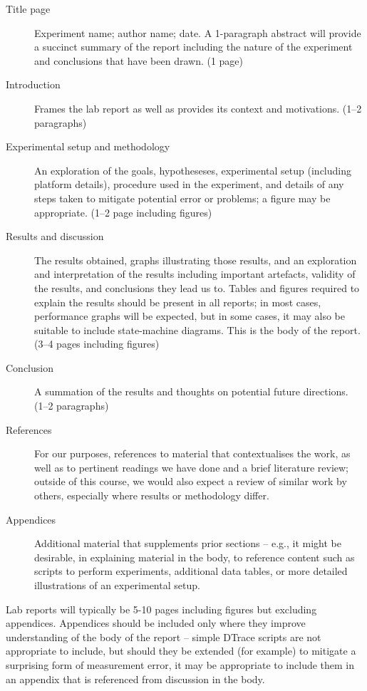 \documentclass[a4paper,10pt]{article}
\begin{document}
\begin{description}
\item[Title page] Experiment name; author name; date.
  A 1-paragraph abstract will provide a succinct summary of the report
  including the nature of the experiment and conclusions that have been drawn.
  (1 page)
\item[Introduction] Frames the lab report as well as provides its context and
  motivations. (1--2 paragraphs)
\item[Experimental setup and methodology] An exploration of the goals,
  hypotheseses, experimental setup (including platform details), procedure
  used in the experiment, and details of any steps taken to mitigate potential
  error or problems; a figure may be appropriate. (1--2 page including
  figures)
\item[Results and discussion]
  The results obtained, graphs illustrating those results, and an exploration
  and interpretation of the results including important artefacts, validity of
  the results, and conclusions they lead us to.
  Tables and figures required to explain the results should be present in all
  reports; in most cases, performance graphs will be expected, but in some
  cases, it may also be suitable to include state-machine diagrams.
  This is the body of the report. (3--4 pages including figures)
\item[Conclusion]
  A summation of the results and thoughts on potential future directions.
  (1--2 paragraphs)
\item[References]
  For our purposes, references to material that contextualises the work, as
  well as to pertinent readings we have done and a brief literature review;
  outside of this course, we would also expect a review of similar work by
  others, especially where results or methodology differ.
\item[Appendices]
  Additional material that supplements prior sections -- e.g., it might be
  desirable, in explaining material in the body, to reference content such as
  scripts to perform experiments, additional data tables, or more detailed
  illustrations of an experimental setup.
\end{description}

Lab reports will typically be 5-10 pages including figures but excluding
appendices.
Appendices should be included only where they improve understanding of the
body of the report -- simple DTrace scripts are not appropriate to include,
but should they be extended (for example) to mitigate a surprising form of
measurement error, it may be appropriate to include them in an appendix that
is referenced from discussion in the body.
\end{document}
